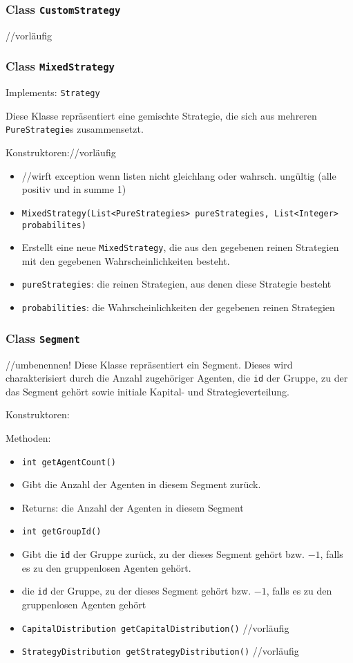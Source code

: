 \documentclass[parskip=full,11pt]{scrartcl}
\begin{document}
\subsubsection{Class \texttt{CustomStrategy}}
//vorläufig

\subsubsection{Class \texttt{MixedStrategy}}
Implements: \texttt{Strategy}

Diese Klasse repräsentiert eine gemischte Strategie, die sich aus mehreren \texttt{PureStrategie}s zusammensetzt.

Konstruktoren://vorläufig
\begin{itemize}\itemsep -10pt
\item[] //wirft exception wenn listen nicht gleichlang oder wahrsch. ungültig (alle positiv und in summe 1)
\item \texttt{MixedStrategy(List<PureStrategies> pureStrategies, List<Integer> probabilites)}
\item[] Erstellt eine neue \texttt{MixedStrategy}, die aus den gegebenen reinen Strategien mit den gegebenen Wahrscheinlichkeiten besteht.
\item[] \texttt{pureStrategies}: die reinen Strategien, aus denen diese Strategie besteht
\item[] \texttt{probabilities}: die Wahrscheinlichkeiten der gegebenen reinen Strategien
\end{itemize}

\subsubsection{Class \texttt{Segment}}
//umbenennen!
Diese Klasse repräsentiert ein Segment. Dieses wird charakterisiert durch die Anzahl zugehöriger Agenten, die \texttt{id} der Gruppe, zu der das Segment gehört sowie initiale Kapital- und Strategieverteilung.

Konstruktoren:

Methoden:
\begin{itemize}\itemsep -10pt
\item \texttt{int getAgentCount()}
\item[] Gibt die Anzahl der Agenten in diesem Segment zurück.
\item[] Returns: die Anzahl der Agenten in diesem Segment

\item \texttt{int getGroupId()}
\item[] Gibt die \texttt{id} der Gruppe zurück, zu der dieses Segment gehört bzw. \(-1\), falls es zu den gruppenlosen Agenten gehört.
\item[]die \texttt{id} der Gruppe, zu der dieses Segment gehört bzw. \(-1\), falls es zu den gruppenlosen Agenten gehört

\item \texttt{CapitalDistribution getCapitalDistribution()}
//vorläufig
\item \texttt{StrategyDistribution getStrategyDistribution()}
//vorläufig
\end{itemize}
\end{document}

